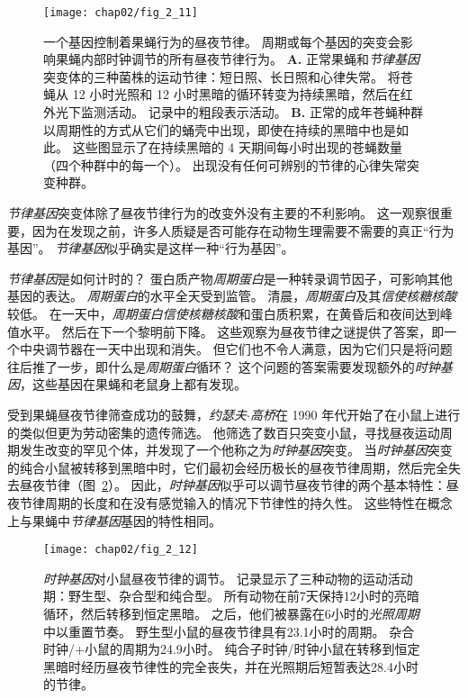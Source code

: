 \begin{figure}[htbp]
	\centering
	\texttt{[image: chap02/fig\_2\_11]}
	\caption{一个基因控制着果蝇行为的昼夜节律。
		周期或每个基因的突变会影响果蝇内部时钟调节的所有昼夜节律行为\cite{konopka1971clock}。
		\textbf{A.} 正常果蝇和\textit{节律基因}突变体的三种菌株的运动节律：短日照、长日照和心律失常。
		将苍蝇从 12 小时光照和 12 小时黑暗的循环转变为持续黑暗，然后在红外光下监测活动。
		记录中的粗段表示活动。
		\textbf{B.} 正常的成年苍蝇种群以周期性的方式从它们的蛹壳中出现，即使在持续的黑暗中也是如此。
		这些图显示了在持续黑暗的 4 天期间每小时出现的苍蝇数量（四个种群中的每一个）。
		出现没有任何可辨别的节律的心律失常突变种群。}
	\label{fig:2_11}
\end{figure}


\textit{节律基因}突变体除了昼夜节律行为的改变外没有主要的不利影响。
这一观察很重要，因为在发现之前，许多人质疑是否可能存在动物生理需要不需要的真正“行为基因”。
\textit{节律基因}似乎确实是这样一种“行为基因”。


\textit{节律基因}是如何计时的？
蛋白质产物\textit{周期蛋白}是一种转录调节因子，可影响其他基因的表达。
\textit{周期蛋白}的水平全天受到监管。
清晨，\textit{周期蛋白}及其\textit{信使核糖核酸}较低。
在一天中，\textit{周期蛋白}\textit{信使核糖核酸}和蛋白质积累，在黄昏后和夜间达到峰值水平。
然后在下一个黎明前下降。
这些观察为昼夜节律之谜提供了答案，即一个中央调节器在一天中出现和消失。
但它们也不令人满意，因为它们只是将问题往后推了一步，即什么是\textit{周期蛋白}循环？
这个问题的答案需要发现额外的\textit{时钟基因}，这些基因在果蝇和老鼠身上都有发现。



受到果蝇昼夜节律筛查成功的鼓舞，\textit{约瑟夫$\cdot$高桥}在 1990 年代开始了在小鼠上进行的类似但更为劳动密集的遗传筛选。
他筛选了数百只突变小鼠，寻找昼夜运动周期发生改变的罕见个体，并发现了一个他称之为\textit{时钟基因}突变。
当\textit{时钟基因}突变的纯合小鼠被转移到黑暗中时，它们最初会经历极长的昼夜节律周期，然后完全失去昼夜节律（图~\ref{fig:2_12}）。
因此，\textit{时钟基因}似乎可以调节昼夜节律的两个基本特性：昼夜节律周期的长度和在没有感觉输入的情况下节律性的持久性。
这些特性在概念上与果蝇中\textit{节律基因}基因的特性相同。




\begin{figure}[htbp]
	\centering
	\texttt{[image: chap02/fig\_2\_12]}
	\caption{\textit{时钟基因}对小鼠昼夜节律的调节。
		记录显示了三种动物的运动活动期：野生型、杂合型和纯合型。
		所有动物在前7天保持12小时的亮暗循环，然后转移到恒定黑暗。
		之后，他们被暴露在6小时的\textit{光照周期}中以重置节奏。
		野生型小鼠的昼夜节律具有23.1小时的周期。
		杂合时钟/+小鼠的周期为24.9小时。
		纯合子时钟/时钟小鼠在转移到恒定黑暗时经历昼夜节律性的完全丧失，并在光照期后短暂表达28.4小时的节律\cite{takahashi1994forward}。}
	\label{fig:2_12}
\end{figure}


